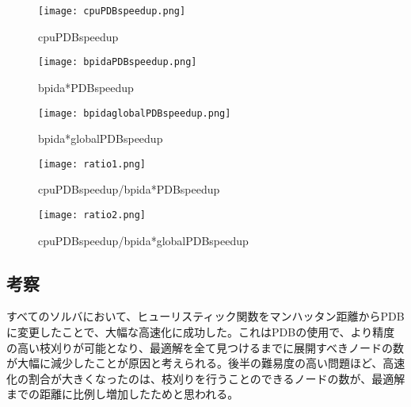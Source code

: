 \documentclass[a4paper,11pt,oneside,openany]{jsbook}
\begin{document}
\begin{figure}[H]
\begin{center}
\texttt{[image: cpuPDBspeedup.png]}
\caption{cpuPDBspeedup}
\end{center}
\end{figure}

\begin{figure}[H]
\begin{center}
\texttt{[image: bpidaPDBspeedup.png]}
\caption{bpida*PDBspeedup}
\end{center}
\end{figure}

\begin{figure}[H]
\begin{center}
\texttt{[image: bpidaglobalPDBspeedup.png]}
\caption{bpida*globalPDBspeedup}
\end{center}
\end{figure}


\begin{figure}[H]
\begin{minipage}{0.5\hsize}
\begin{center}
\texttt{[image: ratio1.png]}
\caption{cpuPDBspeedup/bpida*PDBspeedup}
\end{center}
\end{minipage}
\begin{minipage}{0.5\hsize}
\begin{center}
\texttt{[image: ratio2.png]}
\caption{cpuPDBspeedup/bpida*globalPDBspeedup}
\end{center}
\end{minipage}
\end{figure}



\subsection{考察}
すべてのソルバにおいて、ヒューリスティック関数をマンハッタン距離からPDBに変更したことで、大幅な高速化に成功した。これはPDBの使用で、より精度の高い枝刈りが可能となり、最適解を全て見つけるまでに展開すべきノードの数が大幅に減少したことが原因と考えられる。後半の難易度の高い問題ほど、高速化の割合が大きくなったのは、枝刈りを行うことのできるノードの数が、最適解までの距離に比例し増加したためと思われる。
\end{document}
